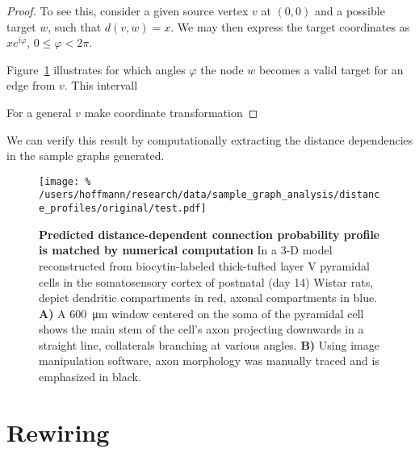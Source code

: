 \begin{proof}
  To see this, consider a given source vertex $v$ at $(0,0)$ and a
  possible target $w$, such that $d(v,w) = x$. We may then express the
  target coordinates as $x e^{i\varphi}$, $0 \le \varphi < 2\pi$.

  Figure~\ref{fig:geomtr_prb} illustrates for which angles
  $\varphi$ the node $w$ becomes a valid target for an edge from
  $v$. This intervall

  \begin{figure}[h] 
    \centering 
    \label{fig:geomtr_prb}
  \end{figure}

  For a general $v$ make coordinate transformation

\end{proof}

We can verify this result by computationally extracting the distance
dependencies in the sample graphs generated. 

\begin{figure}[!htbp]
  \centering
  \texttt{[image: \%
    /users/hoffmann/research/data/sample\_graph\_analysis/distance\_profiles/original/test.pdf]} %
  \caption{\textbf{Predicted distance-dependent connection probability
    profile is matched by numerical computation} In a
    3-D model reconstructed from biocytin-labeled thick-tufted layer V
    pyramidal cells in the somatosensory cortex of postnatal (day 14)
    Wistar rats, \textcite{Romand2011} depict dendritic compartments in
    red, axonal compartments in blue.  \textbf{A)} A
    \SI{600}{\micro\meter} window centered on the soma of the pyramidal
    cell shows the main stem of the cell's axon projecting downwards in a
    straight line, collaterals branching at various angles. \textbf{B)}
    Using image manipulation software, axon morphology was manually traced
    and is emphasized in black.} %
  \label{fig:distance_theory_compare}%
\end{figure}





\section{Rewiring}

